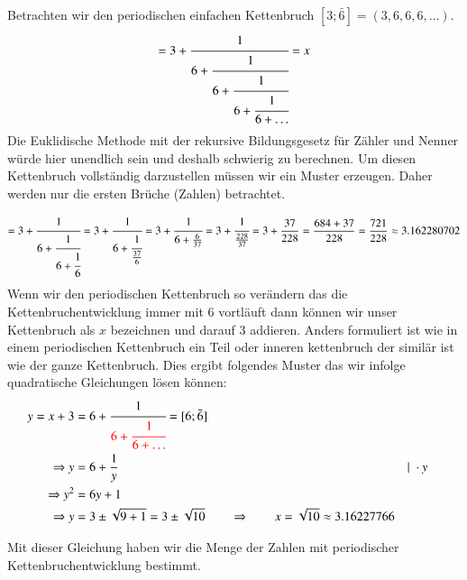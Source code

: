 \begin{beispiel}
Betrachten wir den periodischen einfachen Kettenbruch $[3;\bar{6}] = (3,6,6,6,\dots)$.
\begin{equation}
[3;\bar{6}]
=
3 + \cfrac{1}{6+\cfrac{1}{6+\cfrac{1}{6+\cfrac{1}{6+\dots}}}}
=
x
\end{equation}
Die Euklidische Methode mit der rekursive Bildungsgesetz für Zähler
und Nenner würde hier unendlich sein und deshalb schwierig zu
berechnen.
Um diesen Kettenbruch vollständig darzustellen müssen wir ein Muster
erzeugen. Daher werden nur die ersten Brüche (Zahlen) betrachtet.

\begin{equation}
[3;6,6,6]
=
3 + \cfrac{1}{6+\cfrac{1}{6+\cfrac{1}{6}}}
=
3 + \cfrac{1}{6+\cfrac{1}{\frac{37}{6}}}
=
3 + \cfrac{1}{6+\frac{6}{37}}
=
3 + \cfrac{1}{\frac{228}{37}}
=
3 + \frac{37}{228}
=
\frac{684+37}{228}
=
\frac{721}{228}
\approx
3.162280702
\end{equation}
Wenn wir den periodischen Kettenbruch so verändern das die Kettenbruchentwicklung 
immer mit 6 vortläuft dann können wir unser Kettenbruch als $x$ bezeichnen 
und darauf 3 addieren. Anders formuliert ist wie in einem periodischen Kettenbruch 
ein {\color{red}Teil oder inneren kettenbruch} der similär ist wie der ganze Kettenbruch. Dies ergibt 
folgendes Muster das wir infolge quadratische
Gleichungen lösen können:
\begin{align*}
y = x+3 &= 6 + \cfrac{1}{\color{red}6+\cfrac{1}{6+\dots}} = [6;\bar{6}]
\\
\Rightarrow y &= 6 + \frac{1}{y}	&&\vert\;\cdot y
\\
\Rightarrow y^2 &= 6y + 1
\\
\Rightarrow y &= 3\pm \sqrt{9+1} = 3 \pm \sqrt{10}\qquad\Rightarrow\qquad x = \sqrt{10}
\approx
3.16227766
\end{align*}
\end{beispiel}
Mit dieser Gleichung haben wir die Menge der Zahlen mit periodischer 
Kettenbruchentwicklung bestimmt. 

